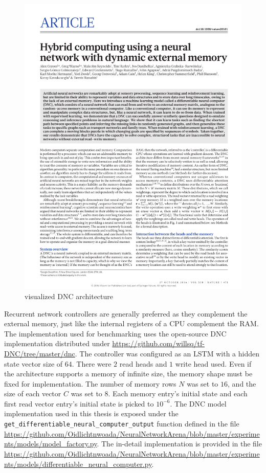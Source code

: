 \documentclass[draft,final]{vutinfth} %
\begin{document}
    \begin{figure}[H]
        \centering{}
        \includegraphics[page=2,width=\linewidth,trim={125 550 130 55},clip]{literature/hybrid_computing_using_a_neural_network_with_dynamic_external_memory.pdf}
        \caption{visualized DNC architecture \cite[p. 2]{DNC}}
        \label{fig:dnc_vis}
    \end{figure}
    Recurrent network controllers are generally preferred as they complement the external memory, just like the internal registers of a CPU complement the RAM.
    The implementation used for benchmarking uses the open-source DNC implementation distributed under \url{https://github.com/willsq/tf-DNC/tree/master/dnc}.
    The controller was configured as an LSTM with a hidden state vector size of $64$. There were $2$ read heads and $1$ write head used.
    Even if the architecture supports a memory of infinite size, the memory shape must be fixed for implementation.
    The number of memory rows $N$ was set to $16$, and the size of each vector $C$ was set to $8$.
    Each memory entry's initial state and each first read vector entry's initial state is picked to $10^{-6}$.
    The DNC model implementation used in this thesis is exposed under the \texttt{get\_differentiable\_neural\_computer\_output} function defined in the file \url{https://github.com/Oidlichtnwoada/NeuralNetworkArena/blob/master/experiments/models/model_factory.py}.
    The in-detail implementation is provided in the file \url{https://github.com/Oidlichtnwoada/NeuralNetworkArena/blob/master/experiments/models/differentiable_neural_computer.py}.
\end{document}
